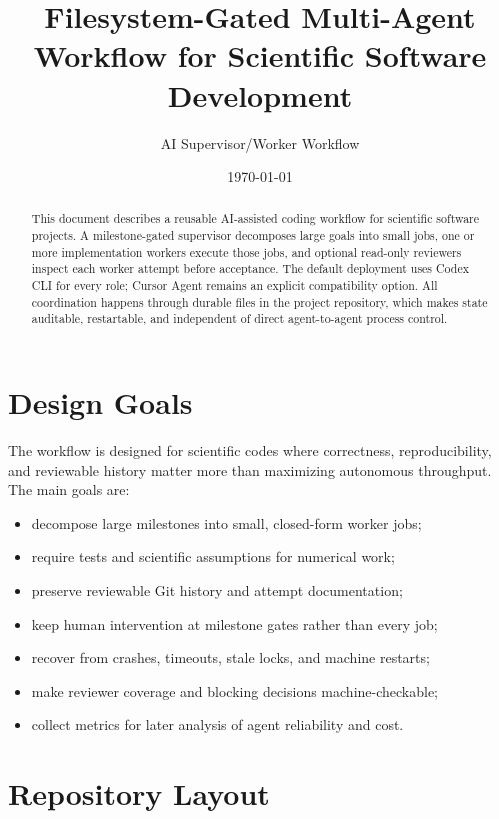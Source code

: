 \documentclass[11pt]{article}
\title{Filesystem-Gated Multi-Agent Workflow for Scientific Software Development}
\author{AI Supervisor/Worker Workflow}
\date{\today}
\begin{document}
\maketitle

\begin{abstract}
This document describes a reusable AI-assisted coding workflow for scientific
software projects.  A milestone-gated supervisor decomposes large goals into
small jobs, one or more implementation workers execute those jobs, and optional
read-only reviewers inspect each worker attempt before acceptance.  The default
deployment uses Codex CLI for every role; Cursor Agent remains an explicit
compatibility option.  All
coordination happens through durable files in the project repository, which
makes state auditable, restartable, and independent of direct agent-to-agent
process control.
\end{abstract}

\section{Design Goals}

The workflow is designed for scientific codes where correctness, reproducibility,
and reviewable history matter more than maximizing autonomous throughput.  The
main goals are:

\begin{itemize}
  \item decompose large milestones into small, closed-form worker jobs;
  \item require tests and scientific assumptions for numerical work;
  \item preserve reviewable Git history and attempt documentation;
  \item keep human intervention at milestone gates rather than every job;
  \item recover from crashes, timeouts, stale locks, and machine restarts;
  \item make reviewer coverage and blocking decisions machine-checkable;
  \item collect metrics for later analysis of agent reliability and cost.
\end{itemize}

\section{Repository Layout}
\end{document}
